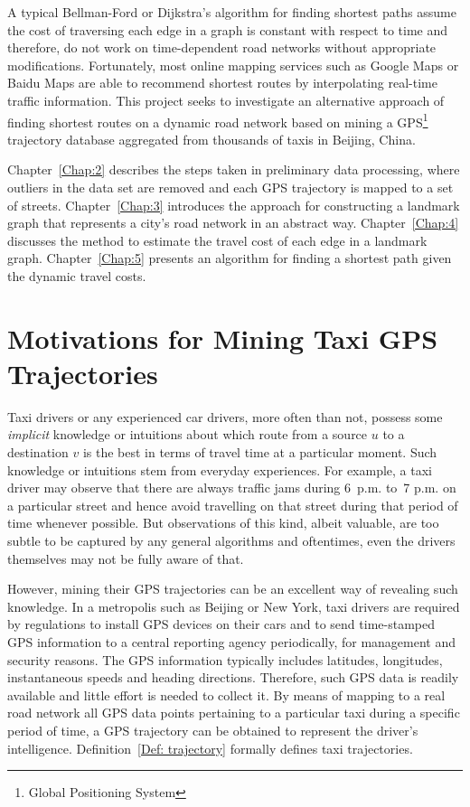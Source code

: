 A typical Bellman-Ford \cite{CLRS09} or Dijkstra's algorithm \cite{Dij59} for finding shortest paths assume the cost of traversing each edge in a graph is constant with respect to time and therefore, do not work on time-de\-pendent road networks without appropriate modifications. Fortunately, most online mapping services such as Google Maps or Baidu Maps are able to recommend shortest routes by interpolating real-time traffic information. This project seeks to investigate an alternative approach of finding shortest routes on a dynamic road network based on mining a GPS\footnote{Global Positioning System} trajectory database aggregated from thousands of taxis in Beijing, China.

Chapter~\ref{Chap:2} describes the steps taken in preliminary data processing, where outliers in the data set are removed and each GPS trajectory is mapped to a set of streets. Chapter~\ref{Chap:3} introduces the approach for constructing a landmark graph that represents a city's road network in an abstract way. Chapter~\ref{Chap:4} discusses the method to estimate the travel cost of each edge in a landmark graph. Chapter~\ref{Chap:5} presents an algorithm for finding a shortest path given the dynamic travel costs. 

\section{Motivations for Mining Taxi GPS Trajectories}
Taxi drivers or any experienced car drivers, more often than not, possess some \emph{implicit} knowledge or intuitions about which route from a source $u$ to a destination $v$ is the best in terms of travel time at a particular moment. Such knowledge or intuitions stem from everyday experiences. For example, a taxi driver may observe that there are always traffic jams during 6~p.m. to~7 p.m. on a particular street and hence avoid travelling on that street during that period of time whenever possible. But observations of this kind, albeit valuable, are too subtle to be captured by any general algorithms and oftentimes, even the drivers themselves may not be fully aware of that.

However, mining their GPS trajectories can be an excellent way of revealing such knowledge. In a metropolis such as Beijing or New York, taxi drivers are required by regulations to install GPS devices on their cars and to send time-stamped GPS information to a central reporting agency periodically, for management and security reasons. The GPS information typically includes latitudes, longitudes, instantaneous speeds and heading directions. Therefore, such GPS data is readily available and little effort is needed to collect it. By means of mapping to a real road network all GPS data points pertaining to a particular taxi during a specific period of time, a GPS trajectory can be obtained to represent the driver's intelligence. Definition~\ref{Def: trajectory} formally defines taxi trajectories. 

